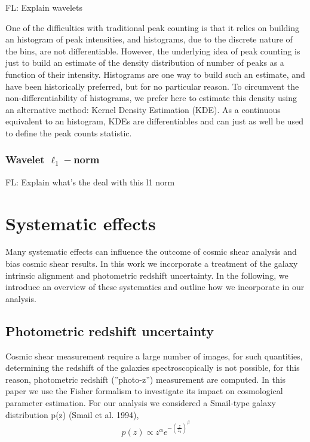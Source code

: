 \documentclass[twocolumn,twocolappendix]{aastex63}
\newcommand{\EiffL}[1]{{\color{cyan}FL: #1}}
\begin{document}
\EiffL{Explain wavelets}

One of the difficulties with traditional peak counting is that it relies on building
an histogram of peak intensities, and histograms, due to the discrete nature of the bins, are not differentiable. However, the underlying idea of peak counting is just to build an estimate of the density distribution of number of peaks as a function of their intensity. Histograms are one way to build such an estimate, and have been historically preferred, but for no particular reason. To circumvent the non-differentiability of histograms, we prefer here to estimate this density using an alternative method: Kernel Density Estimation (KDE). As a continuous equivalent to an histogram, KDEs are differentiables and can just as well be used to define the peak counts statistic.

\subsubsection{Wavelet $\ell_1-$norm}




\EiffL{Explain what's the deal with this l1 norm}

\section{Systematic effects}
Many systematic effects can influence the outcome of cosmic shear analysis and bias cosmic shear results. 
In this work we incorporate a treatment of the galaxy intrinsic alignment and photometric redshift uncertainty.
In the following, we introduce an overview of these systematics and outline how we incorporate in our analysis.

\subsection{Photometric redshift uncertainty}
Cosmic shear measurement require a large number of images, for such quantities, determining the redshift of the galaxies spectroscopically is not possible, for this reason, photometric redshift (''photo-z'') measurement are computed.
In this paper we use the Fisher formalism to investigate its impact on cosmological parameter estimation.
For our analysis we considered a Smail-type galaxy distribution p(z) (Smail et al. 1994),
\begin{equation}\label{photz}
    p(z) \propto z^{\alpha} e^{-(\frac{z}{z_0})^{\beta}}
\end{equation}
\end{document}

